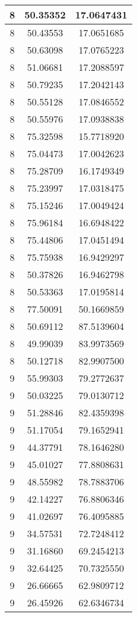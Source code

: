 \documentclass[
]{book}
\begin{document}
\begin{tabular}{c|c|c}
\hline
8 & 50.35352 & 17.0647431\\
\hline
8 & 50.43553 & 17.0651685\\
\hline
8 & 50.63098 & 17.0765223\\
\hline
8 & 51.06681 & 17.2088597\\
\hline
8 & 50.79235 & 17.2042143\\
\hline
8 & 50.55128 & 17.0846552\\
\hline
8 & 50.55976 & 17.0938838\\
\hline
8 & 75.32598 & 15.7718920\\
\hline
8 & 75.04473 & 17.0042623\\
\hline
8 & 75.28709 & 16.1749349\\
\hline
8 & 75.23997 & 17.0318475\\
\hline
8 & 75.15246 & 17.0049424\\
\hline
8 & 75.96184 & 16.6948422\\
\hline
8 & 75.44806 & 17.0451494\\
\hline
8 & 75.75938 & 16.9429297\\
\hline
8 & 50.37826 & 16.9462798\\
\hline
8 & 50.53363 & 17.0195814\\
\hline
8 & 77.50091 & 50.1669859\\
\hline
8 & 50.69112 & 87.5139604\\
\hline
8 & 49.99039 & 83.9973569\\
\hline
8 & 50.12718 & 82.9907500\\
\hline
9 & 55.99303 & 79.2772637\\
\hline
9 & 50.03225 & 79.0130712\\
\hline
9 & 51.28846 & 82.4359398\\
\hline
9 & 51.17054 & 79.1652941\\
\hline
9 & 44.37791 & 78.1646280\\
\hline
9 & 45.01027 & 77.8808631\\
\hline
9 & 48.55982 & 78.7883706\\
\hline
9 & 42.14227 & 76.8806346\\
\hline
9 & 41.02697 & 76.4095885\\
\hline
9 & 34.57531 & 72.7248412\\
\hline
9 & 31.16860 & 69.2454213\\
\hline
9 & 32.64425 & 70.7325550\\
\hline
9 & 26.66665 & 62.9809712\\
\hline
9 & 26.45926 & 62.6346734\\

\end{tabular}
\end{document}
